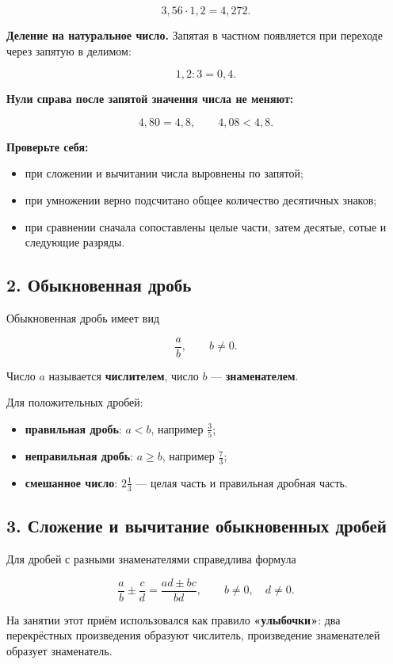 \documentclass[a4paper,12pt]{article}
\begin{document}
\[
3{,}56\cdot1{,}2=4{,}272.
\]

\textbf{Деление на натуральное число.}
Запятая в частном появляется при переходе через запятую
в делимом:

\[
1{,}2:3=0{,}4.
\]

\textbf{Нули справа после запятой значения числа не меняют:}

\[
4{,}80=4{,}8,
\qquad
4{,}08<4{,}8.
\]

\textbf{Проверьте себя:}
\begin{itemize}
  \item при сложении и вычитании числа выровнены по запятой;
  \item при умножении верно подсчитано общее количество
        десятичных знаков;
  \item при сравнении сначала сопоставлены целые части,
        затем десятые, сотые и следующие разряды.
\end{itemize}

\subsection*{2. Обыкновенная дробь}

Обыкновенная дробь имеет вид

\[
\frac{a}{b},
\qquad
b\ne0.
\]

Число \(a\) называется \textbf{числителем},
число \(b\) --- \textbf{знаменателем}.

Для положительных дробей:

\begin{itemize}
  \item \textbf{правильная дробь}: \(a<b\),
        например \(\frac35\);
  \item \textbf{неправильная дробь}: \(a\ge b\),
        например \(\frac73\);
  \item \textbf{смешанное число}:
        \(2\frac13\) --- целая часть и правильная дробная часть.
\end{itemize}

\subsection*{3. Сложение и вычитание обыкновенных дробей}

Для дробей с разными знаменателями справедлива формула

\[
\frac{a}{b}\pm\frac{c}{d}
=
\frac{ad\pm bc}{bd},
\qquad
b\ne0,
\quad
d\ne0.
\]

На занятии этот приём использовался как правило
\textbf{«улыбочки»}:
два перекрёстных произведения образуют числитель,
произведение знаменателей образует знаменатель.
\end{document}
